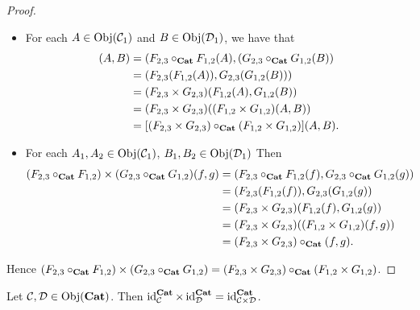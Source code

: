 \documentclass{book}
\begin{document}
	\begin{proof}\
		\begin{itemize}
			\item For each $A \in \operatorname{Obj}(\mathcal{C}_1)$ and $B \in \operatorname{Obj}(\mathcal{D}_1)$, we have that 
			\begin{align*}
				[(F_{2,3} \circ_{\bCat} F_{1,2}) \times (G_{2,3} \circ_{\bCat} G_{1,2})](A,B)
				& = (F_{2,3} \circ_{\bCat} F_{1,2}(A), (G_{2,3} \circ_{\bCat} G_{1,2}(B)) \\
				& = (F_{2,3} (F_{1,2}(A)), G_{2,3}(G_{1,2}(B))) \\
				& = (F_{2,3} \times G_{2,3})(F_{1,2}(A), G_{1,2}(B)) \\
				& = (F_{2,3} \times  G_{2,3})((F_{1,2} \times G_{1,2})(A, B)) \\
				& = [(F_{2,3} \times G_{2,3}) \circ_{\bCat } (F_{1,2} \times G_{1,2})](A, B).
			\end{align*}
			\item For each $A_1, A_2 \in \operatorname{Obj}(\mathcal{C}_1)$, $B_1, B_2 \in \operatorname{Obj}(\mathcal{D}_1)$
			Then 
			\begin{align*}
				(F_{2,3} \circ_{\operatorname*{\text{\textbf{Cat}}}} F_{1,2}) \times (G_{2,3} \circ_{\operatorname*{\text{\textbf{Cat}}}} G_{1,2})(f,g)
				& = (F_{2,3} \circ_{\operatorname*{\text{\textbf{Cat}}}} F_{1,2}(f), G_{2,3} \circ_{\operatorname*{\text{\textbf{Cat}}}} G_{1,2}(g)) \\
				& = (F_{2,3}(F_{1,2}(f)), G_{2,3}(G_{1,2}(g)) \\
				& = (F_{2,3} \times G_{2,3})(F_{1,2}(f), G_{1,2}(g)) \\
				& = (F_{2,3} \times G_{2,3})((F_{1,2} \times G_{1,2})(f,g)) \\
				& = (F_{2,3} \times G_{2,3}) \circ_{\operatorname*{\text{\textbf{Cat}}}}(f,g).
			\end{align*}
		\end{itemize}
		Hence $(F_{2,3} \circ_{\operatorname*{\text{\textbf{Cat}}}} F_{1,2}) \times (G_{2,3} \circ_{\operatorname*{\text{\textbf{Cat}}}} G_{1,2}) = (F_{2,3} \times G_{2,3}) \circ_{\operatorname*{\text{\textbf{Cat}}}} (F_{1,2} \times G_{1,2})$.
	\end{proof}
	
	\begin{ex} 
		Let $\mathcal{C}, \mathcal{D} \in \operatorname{Obj}(\operatorname*{\text{\textbf{Cat}}})$. Then $\operatorname{id}_{\mathcal{C}}^{\operatorname*{\text{\textbf{Cat}}}} \times \operatorname{id}_{\mathcal{D}}^{\operatorname*{\text{\textbf{Cat}}}} = \operatorname{id}_{\mathcal{C} \times \mathcal{D}}^{\operatorname*{\text{\textbf{Cat}}}}$.
	\end{ex}
	
\end{document}

